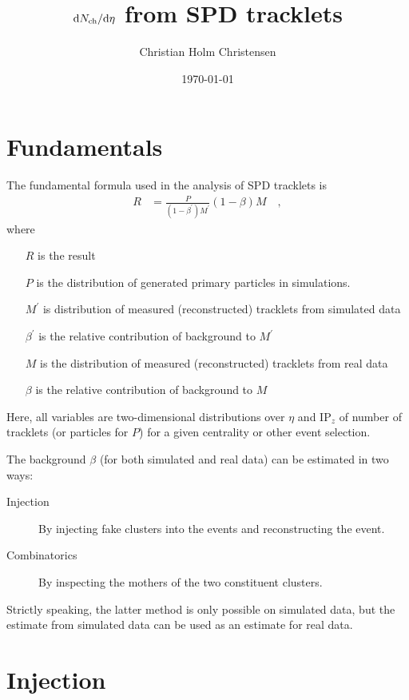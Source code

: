 \documentclass{article}
\title{$\mathrm{d}N_{\mathrm{ch}}/\mathrm{d}\eta$ from SPD tracklets}
\author{Christian Holm Christensen}
\date{\today}
\begin{document}
\maketitle 

\section{Fundamentals}

The fundamental formula used in the analysis of SPD tracklets is 
\begin{align}
  \label{eq:fundamental}
  R &= \frac{P}{(1-\beta^\prime)M^\prime}\left(1-\beta\right)M\quad,
\end{align}
where
\begin{itemize}
\item[$R$] is the result
\item[$P$] is the distribution of generated primary particles in
  simulations. 
\item[$M^\prime$] is distribution of measured (reconstructed) tracklets
  from simulated data 
\item[$\beta^\prime$] is the relative contribution of background to
  $M^\prime$ 
\item[$M$] is the distribution of measured (reconstructed) tracklets
  from real data
\item[$\beta$] is the relative contribution of background to $M$ 
\end{itemize}

Here, all variables are two-dimensional distributions over $\eta$ and
$\mathrm{IP}_z$ of number of tracklets (or particles for $P$) for a
given centrality or other event selection. 

The background $\beta$ (for both simulated and real data) can be
estimated in two ways: 

\begin{description}
\item[Injection] By injecting fake clusters into the events and
  reconstructing the event.
\item[Combinatorics] By inspecting the mothers of the two constituent
  clusters. 
\end{description}

Strictly speaking, the latter method is only possible on simulated
data, but the estimate from simulated data can be used as an estimate
for real data. 

\section{Injection}
\end{document}

